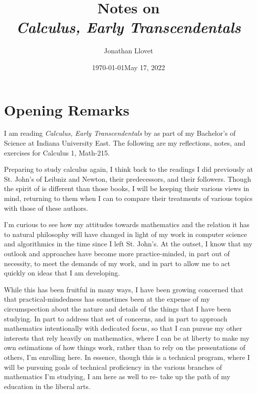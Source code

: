 \documentclass[leqno, 11pt]{report}
\title{Notes on\\\textit{Calculus, Early Transcendentals}}
\author{Jonathan Llovet}
\date{\today}
\begin{document}
\maketitle

\tableofcontents

\newpage

\setcounter{chapter}{-1}

\chapter{Opening Remarks}

\date{May 17, 2022}

I am reading \textit{Calculus, Early Transcendentals} by \citeauthor{briggsCalculusEarlyTranscendentals2019}
as part of my Bachelor's of Science at Indiana University East. The following are my reflections, notes, and
exercises for Calculus 1, Math-215.

Preparing to study calculus again,
I think back to the readings I did previously
at St. John's of Leibniz and Newton, their predecessors, and their followers.
Though the spirit of 
is different than those books, I will be keeping their various views in mind,
returning to them when I can to compare their treatments of various topics with those
of these authors.

I'm curious to see how my attitudes towards mathematics and the relation it has
to natural philosophy will have changed in light of my work in computer science
and algorithmics in the time since I left St. John's. At the outset, I know that
my outlook and approaches have become more practice-minded, in part out of necessity,
to meet the demands of my work, and in part to allow me to act quickly on ideas
that I am developing.

While this has been fruitful in many ways, I have been growing concerned that
that practical-mindedness has sometimes been at the expense of my circumspection
about the nature and details of the things that I have been studying.
In part to address that set of concerns, and in part to approach mathematics intentionally
with dedicated focus, so that I can pursue my other interests that rely heavily
on mathematics, where I can be at liberty to make my own estimations of how things work,
rather than to rely on the presentations of others, I'm enrolling here.
In essence, though this is a technical program, where I will be pursuing
goals of technical proficiency in the various branches of mathematics I'm studying,
I am here as well to re- take up the path of my education in the liberal arts.
\end{document}
